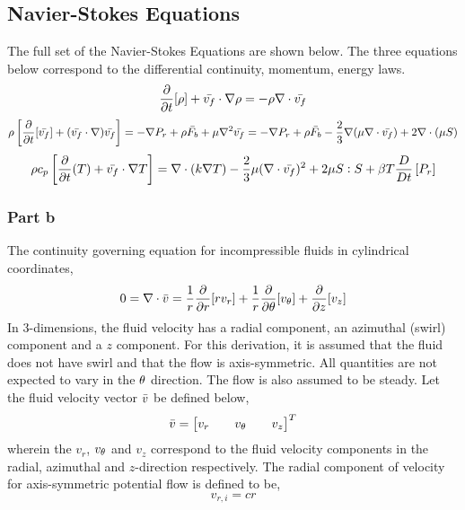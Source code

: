 \documentclass[class=report, 12pt, crop=false]{standalone}
\begin{document}
\begin{center}
\chapter{Navier-Stokes Equations}
\begin{comment}
\end{comment}
The full set of the Navier-Stokes Equations are shown below. The three equations below correspond to the differential continuity, momentum, energy laws.
$$\frac{\partial}{\partial t}[\rho] + \bar{v_f} \cdot \nabla\rho = -\rho \nabla \cdot \bar{v_f}$$
$$\rho \left[\frac{\partial}{\partial t}[\bar{v_f}] + (\bar{v_f} \cdot \nabla) \bar{v_f}\right] = -\nabla P_r + \rho \bar{F_b} + \mu\nabla^2\bar{v_f} = -\nabla P_r + \rho \bar{F_b} - \frac{2}{3}\nabla(\mu\nabla\cdot \bar{v_f}) + 2\nabla\cdot(\mu S)$$
$$\rho c_p\left[\frac{\partial}{\partial t}(T) + \bar{v_f}\cdot\nabla T \right] = \nabla\cdot(k\nabla T) - \frac{2}{3}\mu(\nabla\cdot \bar{v_f})^2 + 2\mu S:S + \beta T \frac{D}{Dt}\left[P_r\right]$$










\subsection{Part b}
The continuity governing equation for incompressible fluids in cylindrical coordinates,
$$0=\nabla\cdot \bar{v} = \frac{1}{r}\frac{\partial}{\partial r}[r v_r] + \frac{1}{r} \frac{\partial}{\partial \theta}[v_\theta] + \frac{\partial}{\partial z}[v_z]$$
In $3$-dimensions, the fluid velocity has a radial component, an azimuthal (swirl) component and a $z$ component. For this derivation, it is assumed that the fluid does not have swirl and that the flow is axis-symmetric. All quantities are not expected to vary in the $\theta$ direction. The flow is also assumed to be steady. Let the fluid velocity vector $\bar{v}$ be defined below,
$$\bar{v} = \begin{bmatrix} v_r && v_\theta && v_z \end{bmatrix}^T$$
wherein the $v_r$, $v_\theta$ and $v_z$ correspond to the fluid velocity components in the radial, azimuthal and $z$-direction respectively. The radial component of velocity for axis-symmetric potential flow is defined to be,
$$v_{r,i} = cr$$


\end{center}
\end{document}
